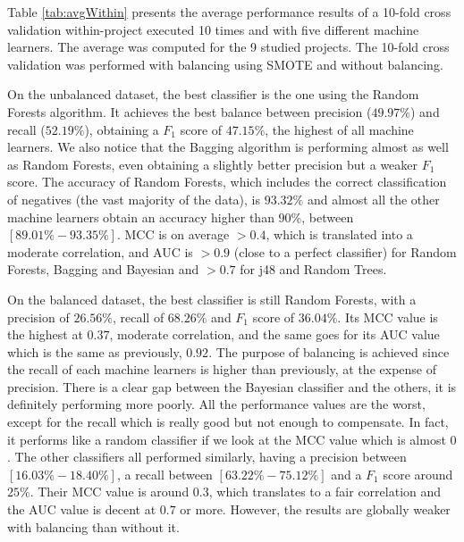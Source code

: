 Table \ref{tab:avgWithin} presents the average performance results of a 10-fold cross validation within-project executed 10 times and with five different machine learners. The average was computed for the 9 studied projects. The 10-fold cross validation was performed with balancing using SMOTE and without balancing.

On the unbalanced dataset, the best classifier is the one using the Random Forests algorithm. It achieves the best balance between precision ($49.97\%$) and recall ($52.19\%$), obtaining a $F_{1}$ score of $47.15\%$, the highest of all machine learners. We also notice that the Bagging algorithm is performing almost as well as Random Forests, even obtaining a slightly better precision but a weaker $F_{1}$ score. The accuracy of Random Forests, which includes the correct classification of negatives (the vast majority of the data), is $93.32\%$ and almost all the other machine learners obtain an accuracy higher than $90\%$, between $[89.01\%-93.35\%]$. MCC is on average $>0.4$, which is translated into a moderate correlation, and AUC is $>0.9$ (close to a perfect classifier) for Random Forests, Bagging and Bayesian and $>0.7$ for j48 and Random Trees.

On the balanced dataset, the best classifier is still Random Forests, with a precision of $26.56\%$, recall of $68.26\%$ and $F_{1}$ score of $36.04\%$. Its MCC value is the highest at $0.37$, moderate correlation, and the same goes for its AUC value which is the same as previously, $0.92$. The purpose of balancing is achieved since the recall of each machine learners is higher than previously, at the expense of precision. There is a clear gap between the Bayesian classifier and the others, it is definitely performing more poorly. All the performance values are the worst, except for the recall which is really good but not enough to compensate. In fact, it performs like a random classifier if we look at the MCC value which is almost $0$. The other classifiers all performed similarly, having a precision between $[16.03\%-18.40\%]$, a recall between $[63.22\%-75.12\%]$ and a $F_{1}$ score around $25\%$. Their MCC value is around $0.3$, which translates to a fair correlation and the AUC value is decent at $0.7$ or more. However, the results are globally weaker with balancing than without it.

